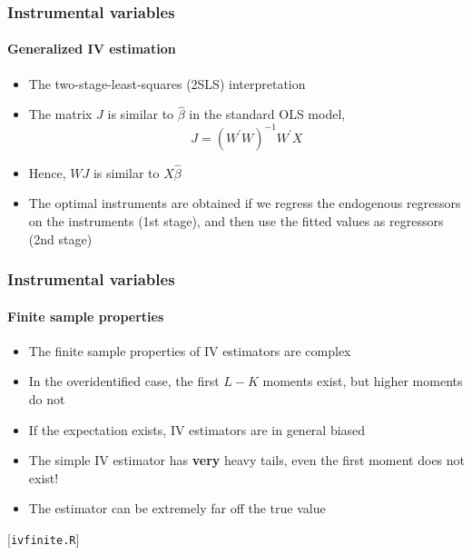 \documentclass[notes=show]{beamer}
\begin{document}
\begin{frame}\frametitle{Instrumental variables}\framesubtitle{Generalized IV estimation}
\begin{itemize}
    \item The two-stage-least-squares (2SLS) interpretation
    \item The matrix $J$ is similar to $\hat{\beta}$ in the standard OLS model,
    \begin{equation*}
        J=\left( W^{\prime }W\right) ^{-1}W^{\prime }X
    \end{equation*}
    \item Hence, $WJ$ is similar to $X\hat{\beta}$
    \item The optimal instruments are obtained if we regress the \newline
    endogenous regressors on the instruments (1st stage), and \newline
    then use the fitted values as regressors (2nd stage)
\end{itemize}
\end{frame}


\begin{frame}\frametitle{Instrumental variables}\framesubtitle{Finite sample properties}
\begin{itemize}
    \item The finite sample properties of IV estimators are complex
    \item In the overidentified case, the first $L-K$ moments exist,\newline
    but higher moments do not
    \item If the expectation exists, IV estimators are in general biased
    \item The simple IV estimator has \textbf{very} heavy tails,\newline
    even the first moment does not exist!
    \item The estimator can be extremely far off the true value
\end{itemize}
\hfill [\texttt{ivfinite.R}]

\end{frame}
\end{document}

